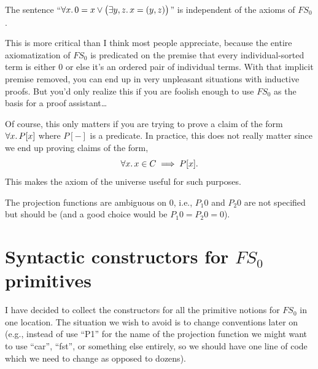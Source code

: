 \begin{problem}[Severe]
The sentence ``$\forall x\ldotp0=x\lor\bigl(\exists y,z\ldotp x=(y,z)\bigr)$''
is independent of the axioms of $FS_{0}$.
\end{problem}

This is more critical than I think most people appreciate, because the
entire axiomatization of $FS_{0}$ is predicated on the premise that
every individual-sorted term is either $0$ or else it's an ordered
pair of individual terms. With that implicit premise removed, you can
end up in very unpleasant situations with inductive proofs. But you'd
only realize this if you are foolish enough to use $FS_{0}$ as the
basis for a proof assistant\dots

Of course, this only matters if you are trying to prove a
claim of the form $\forall x\ldotp P[x]$ where $P[-]$ is a
predicate. In practice, this does not really matter since we end up
proving claims of the form,
\begin{equation*}
\forall x\ldotp x\in C\implies P[x].
\end{equation*}
This makes the axiom of the universe useful for such purposes.

\begin{problem}[Minor]
The projection functions are ambiguous on $0$, i.e., $P_{1}0$ and
$P_{2}0$ are not specified but should be (and a good choice would be
$P_{1}0=P_{2}0=0$). 
\end{problem}

\nwenddocs{}%

\section{Syntactic constructors for $FS_{0}$ primitives}

\begin{node}
I have decided to collect the constructors for all the primitive
notions for $FS_{0}$ in one location. The situation we wish to avoid
is to change conventions later on (e.g., instead of use ``P1'' for the
name of the projection function we might want to use ``car'', ``fst'',
or something else entirely, so we should have one line of code which we
need to change as opposed to dozens).
\end{node}

